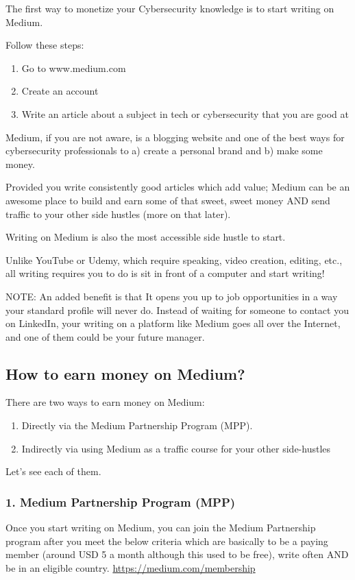 \documentclass[11pt]{article}
\begin{document}
The first way to monetize your Cybersecurity knowledge is to start writing on Medium.

Follow these steps:

\begin{enumerate}
\item Go to www.medium.com
\item Create an account
\item Write an article about a subject in tech or cybersecurity that you are good at
\end{enumerate}

Medium, if you are not aware, is a blogging website and one of the best ways for cybersecurity professionals to a) create a personal brand and b) make some money.

Provided you write consistently good articles which add value; Medium can be an awesome place to build and earn some of that sweet, sweet money AND send traffic to your other side hustles (more on that later).

Writing on Medium is also the most accessible side hustle to start.

Unlike YouTube or Udemy, which require speaking, video creation, editing, etc., all writing requires you to do is sit in front of a computer and start writing!

NOTE: An added benefit is that It opens you up to job opportunities in a way your standard profile will never do. Instead of waiting for someone to contact you on LinkedIn, your writing on a platform like Medium goes all over the Internet, and one of them could be your future manager.

\subsection*{How to earn money on Medium?}
There are two ways to earn money on Medium:

\begin{enumerate}
\item Directly via the Medium Partnership Program (MPP).
\item Indirectly via using Medium as a traffic course for your other side-hustles
\end{enumerate}

Let's see each of them.

\subsubsection*{1. Medium Partnership Program (MPP)}
Once you start writing on Medium, you can join the Medium Partnership program after you meet the below criteria which are basically to be a paying member (around USD 5 a month although this used to be free), write often AND be in an eligible country. \url{https://medium.com/membership}
\end{document}
